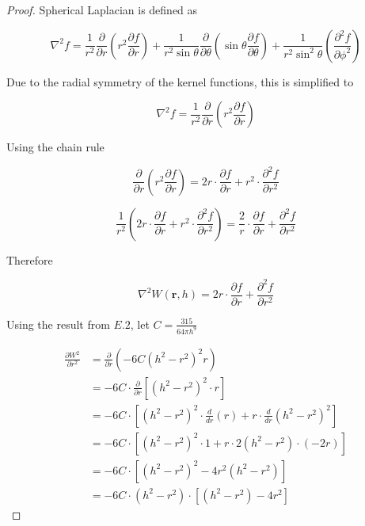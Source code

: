 \documentclass[12pt]{article}
\begin{document}
    \begin{proof}
        Spherical Laplacian is defined as

        $$\nabla^2 f = \frac{1}{r^2}\frac{\partial}{\partial{r}}\left(r^2\frac{\partial{f}}{\partial{r}}\right) + \frac{1}{r^2\sin\theta}\frac{\partial}{\partial{\theta}}\left(\sin\theta\frac{\partial{f}}{\partial{\theta}}\right) + \frac{1}{r^2\sin^2\theta}\left(\frac{\partial^2{f}}{\partial{\phi^2}}\right)$$

        Due to the radial symmetry of the kernel functions, this is simplified to

        $$\nabla^2 f = \frac{1}{r^2}\frac{\partial}{\partial{r}}\left(r^2\frac{\partial{f}}{\partial{r}}\right)$$
        
        Using the chain rule

        $$\frac{\partial}{\partial{r}}\left(r^2\frac{\partial{f}}{\partial{r}}\right) = 2r \cdot \frac{\partial{f}}{\partial{r}} + r^2 \cdot \frac{\partial^2{f}}{\partial{r^2}}$$

        $$\frac{1}{r^2} \left(2r \cdot \frac{\partial{f}}{\partial{r}} + r^2 \cdot \frac{\partial^2{f}}{\partial{r^2}}\right) = \frac{2}{r} \cdot \frac{\partial{f}}{\partial{r}} + \frac{\partial^2{f}}{\partial{r^2}}$$

        Therefore

        $$\nabla^2 W(\textbf{r}, h) = {2}{r} \cdot \frac{\partial{f}}{\partial{r}} + \frac{\partial^2{f}}{\partial{r^2}}$$

        Using the result from $E.2$, let $C = \frac{315}{64\pi{h}^9}$

        \begin{align*}
            \frac{\partial W^2}{\partial r^2} 
            &= \frac{\partial}{\partial r} \left(-6C(h^2 - r^2)^2 r\right) \\
            &= -6C \cdot \frac{\partial}{\partial r} \left[(h^2 - r^2)^2 \cdot r\right] \\
            &= -6C \cdot \left[(h^2 - r^2)^2 \cdot \frac{d}{dr}(r) + r \cdot \frac{d}{dr}(h^2 - r^2)^2\right] \\
            &= -6C \cdot \left[(h^2 - r^2)^2 \cdot 1 + r \cdot 2(h^2 - r^2) \cdot (-2r)\right] \\
            &= -6C \cdot \left[(h^2 - r^2)^2 - 4r^2(h^2 - r^2)\right] \\
            &= -6C \cdot (h^2 - r^2) \cdot \left[(h^2 - r^2) - 4r^2\right]
        \end{align*}


\end{proof}
\end{document}
